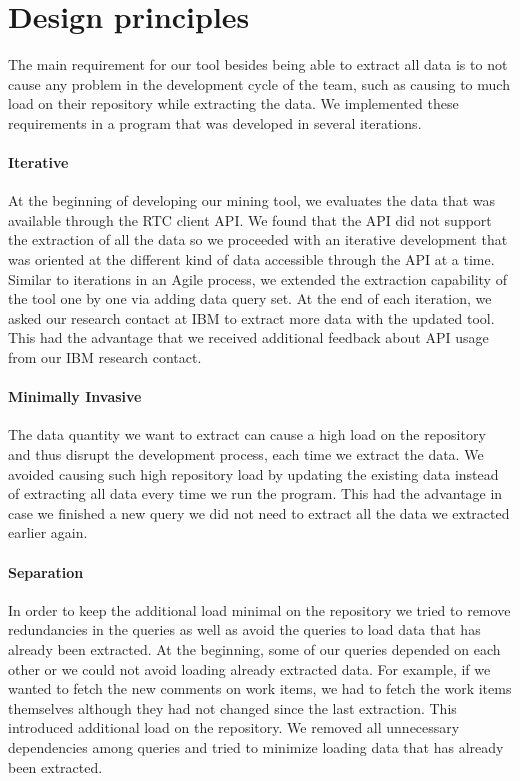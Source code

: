 \section{Design principles}
The main requirement for our tool besides being able to extract all data is to
not cause any problem in the development cycle of the team, such as causing to
much load on their repository while extracting the data. We implemented these
requirements in a program that was developed in several iterations.

\paragraph{Iterative} 
At the beginning of developing our mining tool, we evaluates the data that was
available through the RTC client API. We found that the API did not support the
extraction of all the data so we proceeded with an iterative development that was
oriented at the different kind of data accessible through the API at a time.
Similar to iterations in an Agile process, we extended the extraction capability
of the tool one by one via adding data query set. At the end of each iteration,
we asked our research contact at IBM to extract more data with the updated tool.
This had the advantage that we received additional feedback about API usage from
our IBM research contact.

\paragraph{Minimally Invasive} 
The data quantity we want to extract can cause a high load on the repository and
thus disrupt the development process, each time we extract the data.
We avoided causing such high repository load by updating the existing data
instead of extracting all data every time we run the program. This had the
advantage in case we finished a new query we did not need to extract all the data
we extracted earlier again.

\paragraph{Separation}
In order to keep the additional load minimal on the repository we tried to remove
redundancies in the queries as well as avoid the queries to load data that has
already been extracted. At the beginning, some of our queries depended on each
other or we could not avoid loading already extracted data. For example, if we
wanted to fetch the new comments on work items, we had to fetch the work items
themselves although they had not changed since the last extraction. This
introduced additional load on the repository. We removed all unnecessary
dependencies among queries and tried to minimize loading data that has already
been extracted.

